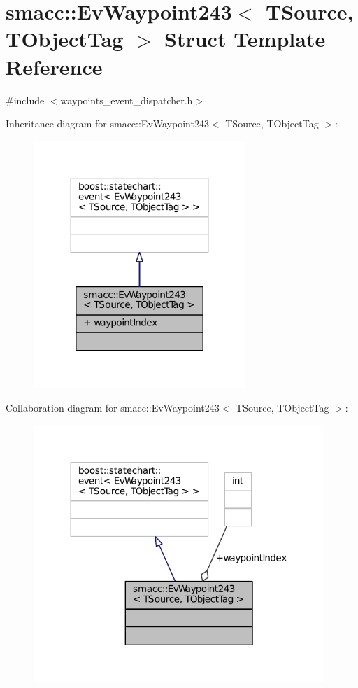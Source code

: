 \hypertarget{structsmacc_1_1EvWaypoint243}{}\section{smacc\+:\+:Ev\+Waypoint243$<$ T\+Source, T\+Object\+Tag $>$ Struct Template Reference}
\label{structsmacc_1_1EvWaypoint243}


{\ttfamily \#include $<$waypoints\+\_\+event\+\_\+dispatcher.\+h$>$}



Inheritance diagram for smacc\+:\+:Ev\+Waypoint243$<$ T\+Source, T\+Object\+Tag $>$\+:
\nopagebreak
\begin{figure}[H]
\begin{center}
\leavevmode
\includegraphics[width=227pt]{structsmacc_1_1EvWaypoint243__inherit__graph}
\end{center}
\end{figure}


Collaboration diagram for smacc\+:\+:Ev\+Waypoint243$<$ T\+Source, T\+Object\+Tag $>$\+:
\nopagebreak
\begin{figure}[H]
\begin{center}
\leavevmode
\includegraphics[width=312pt]{structsmacc_1_1EvWaypoint243__coll__graph}
\end{center}
\end{figure}
